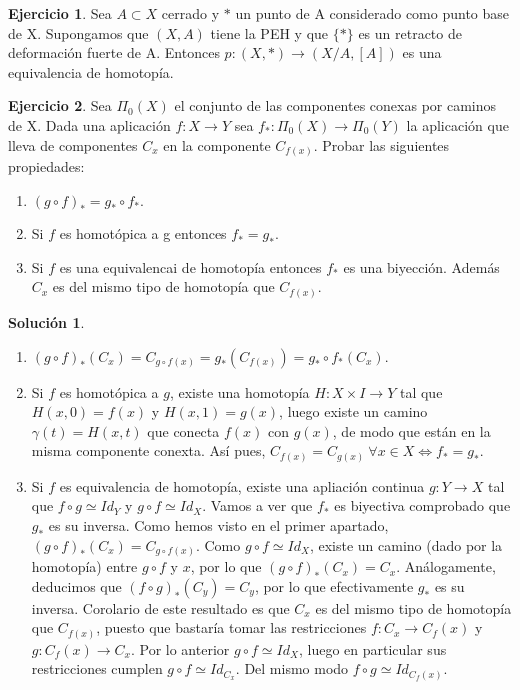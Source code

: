 \documentclass{article}
\theoremstyle{plain}
\theoremstyle{definition}
\newtheorem{exercise}{Ejercicio}
\newtheorem*{sol*}{Solución}
\begin{document}
\newpage
\begin{exercise}
Sea $A\subset X$ cerrado y $*$ un punto de A considerado como punto base de X. Supongamos que $(X,A)$ tiene la PEH y que $\{*\}$ es un retracto de deformación fuerte de A. Entonces $p:(X,*)\to(X/A,[A])$ es una equivalencia de homotopía.
\end{exercise}
\newpage
\begin{exercise}
Sea $\Pi_0(X)$ el conjunto de las componentes conexas por caminos de X. Dada una aplicación $f:X\to Y$ sea $f_*:\Pi_0(X)\to\Pi_0(Y)$ la aplicación que lleva de componentes $C_x$ en la componente $C_{f(x)}$. Probar las siguientes propiedades:
\begin{enumerate}
\item $(g\circ f)_* = g_*\circ f_*$.
\item Si $f$ es homotópica a g entonces $f_*=g_*$.
\item Si $f$ es una equivalencai de homotopía entonces $f_*$ es una biyección. Además $C_x$ es del mismo tipo de homotopía que $C_{f(x)}$.
\end{enumerate}
\end{exercise}
\begin{sol*}
\begin{enumerate}
\item $(g\circ f)_*(C_x)=C_{g\circ f(x)}= g_*(C_{f(x)})=g_*\circ f_*(C_x)$.
\item Si $f$ es homotópica a $g$, existe una homotopía $H:X\times I\to Y$ tal que $H(x,0)=f(x)$ y $H(x,1)=g(x)$, luego existe un camino $\gamma(t)=H(x,t)$ que conecta $f(x)$ con $g(x)$, de modo que están en la misma componente conexta. Así pues, $C_{f(x)}=C_{g(x)}\ \forall x\in X\Leftrightarrow f_*=g_*$.
\item Si $f$ es equivalencia de homotopía, existe una apliación continua $g:Y\to X$ tal que $f\circ g\simeq Id_Y$ y $g\circ f\simeq Id_X$. Vamos a ver que $f_*$ es biyectiva comprobado que $g_*$ es su inversa. Como hemos visto en el primer apartado, $(g\circ f)_*(C_x)=C_{g\circ f(x)}$. Como $g\circ f\simeq Id_X$, existe un camino (dado por la homotopía) entre $g\circ f$ y $x$, por lo que  $(g\circ f)_*(C_x)=C_x$. Análogamente, deducimos que $(f\circ g)_*(C_y)=C_y$, por lo que efectivamente $g_*$ es su inversa. Corolario de este resultado es que $C_x$ es del mismo tipo de homotopía que $C_{f(x)}$, puesto que bastaría tomar las restricciones $f:C_x\to C_f(x)$ y $g:C_f(x)\to C_x$. Por lo anterior $g\circ f\simeq Id_X$, luego en particular sus restricciones cumplen $g\circ f\simeq Id_{C_x}$. Del mismo modo $f\circ g\simeq Id_{C_f(x)}$. 
\end{enumerate}
\end{sol*}
\end{document}
